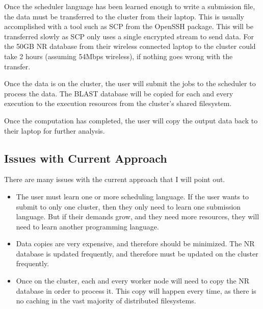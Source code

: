 Once the scheduler language has been learned enough to write a submission file, the data must be transferred to the cluster from their laptop.  This is usually accomplished with a tool such as SCP from the OpenSSH \cite{openssh} package.  This will be transferred slowly as SCP only uses a single encrypted stream to send data.  For the 50GB NR database from their wireless connected laptop to the cluster could take 2 hours (assuming 54Mbps wireless), if nothing goes wrong with the transfer.

Once the data is on the cluster, the user will submit the jobs to the scheduler to process the data.  The BLAST database will be copied for each and every execution to the execution resources from the cluster's shared filesystem.

Once the computation has completed, the user will copy the output data back to their laptop for further analysis.

\subsection{Issues with Current Approach}

There are many issues with the current approach that I will point out.

\begin{itemize}
	\item The user must learn one or more scheduling language.  If the user wants to submit to only one cluster, then they only need to learn one submission language.  But if their demands grow, and they need more resources, they will need to learn another programming language.
	\item Data copies are very expensive, and therefore should be minimized.  The NR database is updated frequently, and therefore must be updated on the cluster frequently.
	\item Once on the cluster, each and every worker node will need to copy the NR database in order to process it.  This copy will happen every time, as there is no caching in the vast majority of distributed filesystems.
\end{itemize}







